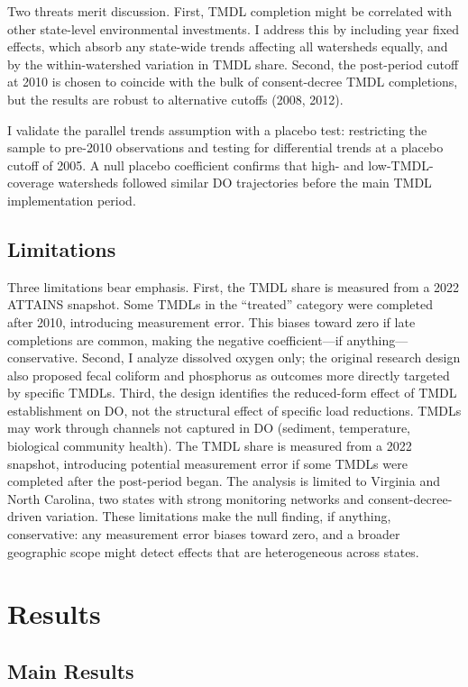 \documentclass[12pt]{article}
\begin{document}
Two threats merit discussion. First, TMDL completion might be correlated with other state-level environmental investments. I address this by including year fixed effects, which absorb any state-wide trends affecting all watersheds equally, and by the within-watershed variation in TMDL share. Second, the post-period cutoff at 2010 is chosen to coincide with the bulk of consent-decree TMDL completions, but the results are robust to alternative cutoffs (2008, 2012).

I validate the parallel trends assumption with a placebo test: restricting the sample to pre-2010 observations and testing for differential trends at a placebo cutoff of 2005. A null placebo coefficient confirms that high- and low-TMDL-coverage watersheds followed similar DO trajectories before the main TMDL implementation period.

\subsection{Limitations}

Three limitations bear emphasis. First, the TMDL share is measured from a 2022 ATTAINS snapshot. Some TMDLs in the ``treated'' category were completed after 2010, introducing measurement error. This biases toward zero if late completions are common, making the negative coefficient---if anything---conservative. Second, I analyze dissolved oxygen only; the original research design also proposed fecal coliform and phosphorus as outcomes more directly targeted by specific TMDLs. Third, the design identifies the reduced-form effect of TMDL establishment on DO, not the structural effect of specific load reductions. TMDLs may work through channels not captured in DO (sediment, temperature, biological community health). The TMDL share is measured from a 2022 snapshot, introducing potential measurement error if some TMDLs were completed after the post-period began. The analysis is limited to Virginia and North Carolina, two states with strong monitoring networks and consent-decree-driven variation. These limitations make the null finding, if anything, conservative: any measurement error biases toward zero, and a broader geographic scope might detect effects that are heterogeneous across states.


\section{Results}
\label{sec:results}

\subsection{Main Results}
\end{document}
